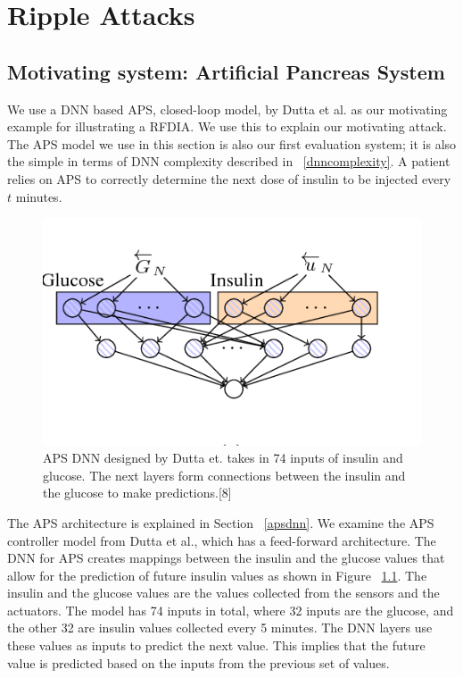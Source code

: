 \chapter{Ripple Attacks}
\label{attack}

\section{Motivating system: Artificial Pancreas System}


We use a DNN based \ac{APS}, closed-loop model, by Dutta et al. \cite{10.1007/978-3-319-99429-1_11}  as our motivating example for illustrating a \ac{RFDIA}. 
We use this to explain our motivating attack. 
The \ac{APS} model we use in this section is also our first evaluation system; it is also the simple in terms of \ac{DNN} complexity described in ~\ref{dnncomplexity}.
A patient relies on  \ac{APS} to correctly determine the next dose of insulin to be injected every $t$ minutes. 

\begin{figure}
	\centering
	\includegraphics[width=0.7\linewidth, height=0.3\linewidth]{Images/APSDNN}
	\caption[APS DNN]{APS DNN designed by Dutta et. takes in 74 inputs of insulin and glucose. The next layers form connections between the insulin and the glucose to make predictions.[8]}
	\label{fig:apsdnn}
\end{figure}

The APS architecture is explained in Section ~\ref{apsdnn}. 
We examine the \ac{APS} controller model from Dutta et al., which has a feed-forward architecture. 
The DNN for APS creates mappings between the insulin and the glucose values that allow for the prediction of future insulin values as shown in Figure ~\ref{fig:apsdnn}. 
The insulin and the glucose values are the values collected from the sensors and the actuators. 
The model has 74 inputs in total, where 32 inputs are the glucose, and the other 32  are insulin values collected every 5 minutes.
 The DNN layers use these values as inputs to predict the next value. 
 This implies that the future value is predicted based on the inputs from the previous set of values. 


